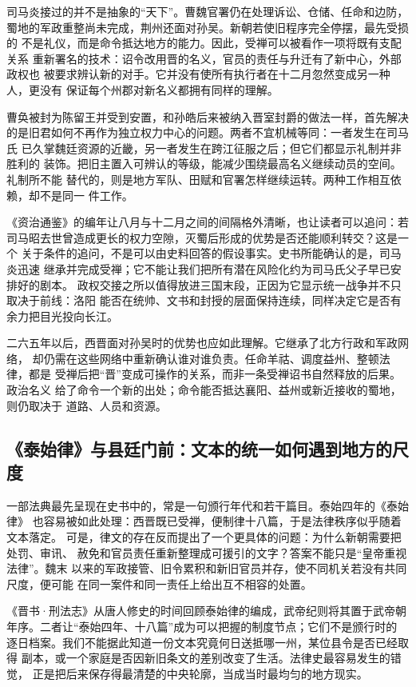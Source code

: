 司马炎接过的并不是抽象的“天下”。曹魏官署仍在处理诉讼、仓储、任命和边防，
蜀地的军政重整尚未完成，荆州还面对孙吴。新朝若使旧程序完全停摆，最先受损的
不是礼仪，而是命令抵达地方的能力。因此，受禅可以被看作一项将既有支配关系
重新署名的技术：诏令改用晋的名义，官员的责任与升迁有了新中心，外部政权也
被要求辨认新的对手。它并没有使所有执行者在十二月忽然变成另一种人，更没有
保证每个州郡对新名义都拥有同样的理解。

曹奂被封为陈留王并受到安置，和孙皓后来被纳入晋室封爵的做法一样，首先解决
的是旧君如何不再作为独立权力中心的问题。两者不宜机械等同：一者发生在司马氏
已久掌魏廷资源的近畿，另一者发生在跨江征服之后；但它们都显示礼制并非胜利的
装饰。把旧主置入可辨认的等级，能减少围绕最高名义继续动员的空间。礼制所不能
替代的，则是地方军队、田赋和官署怎样继续运转。两种工作相互依赖，却不是同一
件工作。

《资治通鉴》的编年让八月与十二月之间的间隔格外清晰，也让读者可以追问：若
司马昭去世曾造成更长的权力空隙，灭蜀后形成的优势是否还能顺利转交？这是一个
关于条件的追问，不是可以由史料回答的假设事实。史书所能确认的是，司马炎迅速
继承并完成受禅；它不能让我们把所有潜在风险化约为司马氏父子早已安排好的剧本。
政权交接之所以值得放进三国末段，正因为它显示统一战争并不只取决于前线：洛阳
能否在统帅、文书和封授的层面保持连续，同样决定它是否有余力把目光投向长江。

二六五年以后，西晋面对孙吴时的优势也应如此理解。它继承了北方行政和军政网络，
却仍需在这些网络中重新确认谁对谁负责。任命羊祜、调度益州、整顿法律，都是
受禅后把“晋”变成可操作的关系，而非一条受禅诏书自然释放的后果。政治名义
给了命令一个新的出处；命令能否抵达襄阳、益州或新近接收的蜀地，则仍取决于
道路、人员和资源。

\subsection{《泰始律》与县廷门前：文本的统一如何遇到地方的尺度}

一部法典最先呈现在史书中的，常是一句颁行年代和若干篇目。泰始四年的《泰始律》
也容易被如此处理：西晋既已受禅，便制律十八篇，于是法律秩序似乎随着文本落定。
可是，律文的存在反而提出了一个更具体的问题：为什么新朝需要把处罚、审讯、
赦免和官员责任重新整理成可援引的文字？答案不能只是“皇帝重视法律”。魏末
以来的军政接管、旧令累积和新旧官员并存，使不同机关若没有共同尺度，便可能
在同一案件和同一责任上给出互不相容的处置。

《晋书·刑法志》从唐人修史的时间回顾泰始律的编成，武帝纪则将其置于武帝朝
年序。二者让“泰始四年、十八篇”成为可以把握的制度节点；它们不是颁行时的
逐日档案。我们不能据此知道一份文本究竟何日送抵哪一州，某位县令是否已经取得
副本，或一个家庭是否因新旧条文的差别改变了生活。法律史最容易发生的错觉，
正是把后来保存得最清楚的中央轮廓，当成当时最均匀的地方现实。

